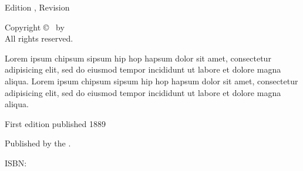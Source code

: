 

\clearpage

\begin{adjustwidth}{0.23\textwidth}{0.23\textwidth}
\begingroup
  \null\vfill
  \begin{center}
  \utitle\par
  Edition \uedition, Revision \urevision\par
  Copyright \copyright{} \udate\ by \uauthor\\
  All rights reserved.\par

  Lorem ipsum chipsum sipsum hip hop hapsum dolor sit amet, consectetur adipisicing elit, sed do eiusmod tempor incididunt ut labore et dolore magna aliqua. Lorem ipsum chipsum sipsum hip hop hapsum dolor sit amet, consectetur adipisicing elit, sed do eiusmod tempor incididunt ut labore et dolore magna aliqua.\par
  
  First edition published 1889\par
  Published by the \upublisher.\par
  ISBN: \uisbn\par

  \uwebsite
  \end{center}
  \vspace*{10mm}
\endgroup
\end{adjustwidth}

\clearpage